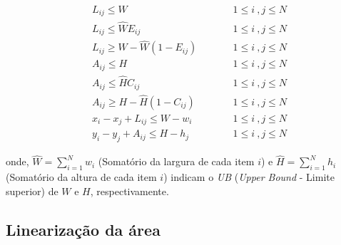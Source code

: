         \begin{small}
            \begin{align}
                \label{eqn:6}
                & {L}_{ij} \leq {W}                                 && \qquad 1 \leq i\ , j \leq N  \\
                \label{eqn:7}
                & {L}_{ij} \leq \widehat{W} {E}_{ij}                && \qquad 1 \leq i\ , j \leq N  \\
                \label{eqn:8}
                & {L}_{ij} \geq {W} - \widehat{W} (1 - {E}_{ij})    && \qquad 1 \leq i\ , j \leq N  \\
                \label{eqn:9}
                & {A}_{ij} \leq {H}                                 && \qquad 1 \leq i\ , j \leq N  \\
                \label{eqn:10}
                & {A}_{ij} \leq \widehat{H} {C}_{ij}                && \qquad 1 \leq i\ , j \leq N  \\
                \label{eqn:11}
                & {A}_{ij} \geq {H} - \widehat{H} (1 - {C}_{ij})    && \qquad 1 \leq i\ , j \leq N \\
                \label{eqn:12}
                &{x}_i - {x}_j + L_{ij} \leq {W} - {w}_i            && \qquad 1 \leq i\ , j \leq N \\
                \label{eqn:13}
                &{y}_i - {y}_j + A_{ij} \leq {H} - {h}_j            && \qquad 1 \leq i\ , j \leq N
            \end{align}
        \end{small}
        
        onde, $\widehat{W} = \sum_{i=1}^N w_i$ (Somatório da largura de cada item $i$) e $\widehat{H} = \sum_{i=1}^N h_i$ (Somatório da altura de cada item $i$) indicam o \emph{UB} (\emph{Upper Bound} - Limite superior) de $W$ e $H$, respectivamente.

        
    \subsection{Linearização da área}
        
